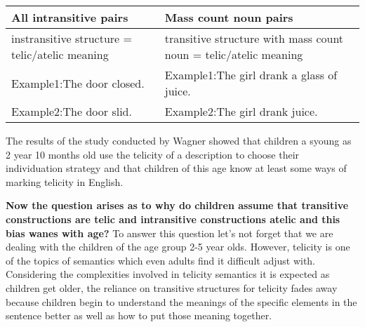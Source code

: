 \documentclass[11pt]{article}
\begin{document}
\begin{longtable}[]{@{}ll@{}}
\toprule
\begin{minipage}[b]{0.50\columnwidth}\raggedright
All intransitive pairs\strut
\end{minipage} & \begin{minipage}[b]{0.44\columnwidth}\raggedright
Mass count noun pairs\strut
\end{minipage}\tabularnewline
\midrule
\endhead
\begin{minipage}[t]{0.50\columnwidth}\raggedright
instransitive structure = telic/atelic meaning\strut
\end{minipage} & \begin{minipage}[t]{0.44\columnwidth}\raggedright
transitive structure with mass count noun = telic/atelic meaning\strut
\end{minipage}\tabularnewline
\begin{minipage}[t]{0.50\columnwidth}\raggedright
Example1:The door closed.\strut
\end{minipage} & \begin{minipage}[t]{0.44\columnwidth}\raggedright
Example1:The girl drank a glass of juice.\strut
\end{minipage}\tabularnewline
\begin{minipage}[t]{0.50\columnwidth}\raggedright
Example2:The door slid.\strut
\end{minipage} & \begin{minipage}[t]{0.44\columnwidth}\raggedright
Example2:The girl drank juice.\strut
\end{minipage}\tabularnewline
\bottomrule
\end{longtable}

    The results of the study conducted by Wagner showed that children a
syoung as 2 year 10 months old use the telicity of a description to
choose their individuation strategy and that children of this age know
at least some ways of marking telicity in English.

\textbf{Now the question arises as to why do children assume that
transitive constructions are telic and intransitive constructions atelic
and this bias wanes with age?} To answer this question let's not forget
that we are dealing with the children of the age group 2-5 year olds.
However, telicity is one of the topics of semantics which even adults
find it difficult adjust with. Considering the complexities involved in
telicity semantics it is expected as children get older, the reliance on
transitive structures for telicity fades away because children begin to
understand the meanings of the specific elements in the sentence better
as well as how to put those meaning together.
\end{document}
